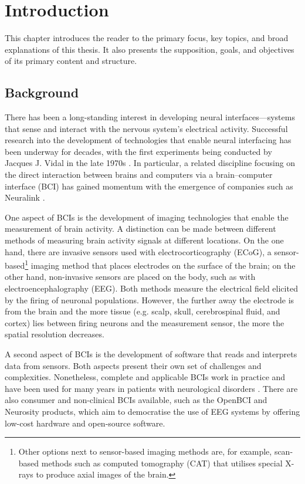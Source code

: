 \chapter{Introduction}
\graphicspath{{Chapter1/Figs/}{Chapter1/Figs/}}

This chapter introduces the reader to the primary focus, key topics, and broad explanations of this thesis. It also presents the supposition, goals, and objectives of its primary content and structure.

\section{Background}
\label{chapter1-background}

There has been a long-standing interest in developing neural interfaces—systems that sense and interact with the nervous system's electrical activity. Successful research into the development of technologies that enable neural interfacing has been underway for decades, with the first experiments being conducted by Jacques J. Vidal in the late 1970s \citep{vidal_real-time_1977}. In particular, a related discipline focusing on the direct interaction between brains and computers via a brain–computer interface (BCI) has gained momentum with the emergence of companies such as Neuralink \citep{mor_brain-computer_2021}.

One aspect of BCIs is the development of imaging technologies that enable the measurement of brain activity. A distinction can be made between different methods of measuring brain activity signals at different locations. On the one hand, there are invasive sensors used with electrocorticography (ECoG), a sensor-based\footnote{Other options next to sensor-based imaging methods are, for example, scan-based methods such as computed tomography (CAT) that utilises special X-rays to produce axial images of the brain.} imaging method that places electrodes on the surface of the brain; on the other hand, non-invasive sensors are placed on the body, such as with electroencephalography (EEG). Both methods measure the electrical field elicited by the firing of neuronal populations. However, the further away the electrode is from the brain and the more tissue (e.g. scalp, skull, cerebrospinal fluid, and cortex) lies between firing neurons and the measurement sensor, the more the spatial resolution decreases.

A second aspect of BCIs is the development of software that reads and interprets data from sensors. Both aspects present their own set of challenges and complexities. Nonetheless, complete and applicable BCIs work in practice and have been used for many years in patients with neurological disorders \citep{braingate_publications_nodate}. There are also consumer and non-clinical BCIs available, such as the OpenBCI and Neurosity products, which aim to democratise the use of EEG systems by offering low-cost hardware and open-source software.

